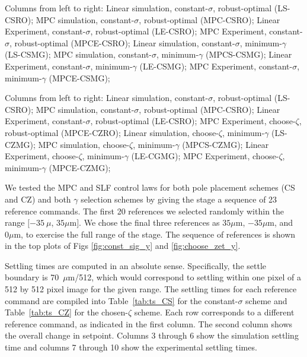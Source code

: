\documentclass[twocolumn,twoside]{IEEEtran}
\begin{document}
\begin{table*}
  \begin{minipage}{1\textwidth}
  \caption{Columns from left to right: Linear simulation, constant-$\sigma$, robust-optimal (LS-CSRO); MPC simulation, constant-$\sigma$, robust-optimal (MPC-CSRO); Linear Experiment, constant-$\sigma$, robust-optimal (LE-CSRO);
    MPC Experiment, constant-$\sigma$, robust-optimal (MPCE-CSRO);
    Linear simulation, constant-$\sigma$, minimum-$\gamma$ (LS-CSMG);
    MPC simulation, constant-$\sigma$, minimum-$\gamma$ (MPCS-CSMG);
    Linear Experiment, constant-$\sigma$, minimum-$\gamma$ (LE-CSMG);
    MPC Experiment, constant-$\sigma$, minimum-$\gamma$ (MPCE-CSMG);
  }
   
   \label{tab:ts_CS}
 \end{minipage}
 \begin{minipage}{1\textwidth}
     \caption{Columns from left to right: Linear simulation, constant-$\sigma$, robust-optimal (LS-CSRO); MPC simulation, constant-$\sigma$, robust-optimal (MPC-CSRO); Linear Experiment, constant-$\sigma$, robust-optimal (LE-CSRO);
    MPC Experiment, choose-$\zeta$, robust-optimal (MPCE-CZRO);
    Linear simulation, choose-$\zeta$, minimum-$\gamma$ (LS-CZMG);
    MPC simulation, choose-$\zeta$, minimum-$\gamma$ (MPCS-CZMG);
    Linear Experiment, choose-$\zeta$, minimum-$\gamma$ (LE-CGMG);
    MPC Experiment, choose-$\zeta$, minimum-$\gamma$ (MPCE-CZMG);
  }
   
   \label{tab:ts_CZ}
 \end{minipage}
   \begin{centering}
    
  \end{centering}
\end{table*}
We tested the MPC and SLF control laws for both pole placement schemes (CS and CZ) and both $\gamma$ selection schemes by giving the stage a sequence of 23 reference commands. The first 20 references we selected randomly within the range $[-35~\mu$, $35\mu\text{m}]$. We chose the final three references as $35\mu$m, $-35\mu$m, and $0\mu$m, to exercise the full range of the stage. The sequence of references is shown in the top plots of Figs \ref{fig:const_sig_y} and \ref{fig:choose_zet_y}.

Settling times are computed in an absolute sense. Specifically, the settle boundary is 70~$\mu$m/512, which would correspond to settling within one pixel of a 512 by 512 pixel image for the given range.
The settling times for each reference command are compiled into Table~\ref{tab:ts_CS} for the constant-$\sigma$ scheme and Table~\ref{tab:ts_CZ} for the chosen-$\zeta$ scheme. Each row corresponds to a different reference command, as indicated in the first column. The second column shows the overall change in setpoint. Columns 3 through 6 show the simulation settling time and columns 7 through 10 show the experimental settling times.
\end{document}
